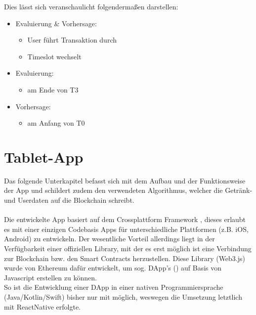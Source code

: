 Dies lässt sich veranschaulicht folgendermaßen darstellen:
\begin{itemize}
	\item Evaluierung \& Vorhersage: 
	      \begin{itemize}
	      	\item User führt Transaktion durch
	      	\item Timeslot wechselt
	      \end{itemize}
	\item Evaluierung:
	      \begin{itemize}
	      	\item am Ende von T3
	      \end{itemize}
	\item Vorhersage:
	      \begin{itemize}
	      	\item am Anfang von T0
	      \end{itemize}
\end{itemize}    


\section{Tablet-App}
\label{sec:app}

Das folgende Unterkapitel befasst sich mit dem Aufbau und der Funktionsweise der App und schildert zudem den verwendeten Algorithmus, welcher die Getränk- und Userdaten auf die Blockchain schreibt.\\\\
Die entwickelte App basiert auf dem Crossplattform Framework  \cite{RN:ReactNative}, dieses erlaubt es mit einer einzigen Codebasis Apps für unterschiedliche Plattformen (z.B. iOS, Android) zu entwickeln. Der wesentliche Vorteil allerdings liegt in der Verfügbarkeit einer offiziellen Library, mit der es erst möglich ist eine Verbindung zur Blockchain bzw. den Smart Contracts herzustellen. Diese Library (Web3.js) wurde von Ethereum dafür entwickelt, um sog. DApp's () \cite{DApp} auf Basis von Javascript erstellen zu können. \\
So ist die Entwicklung einer DApp in einer nativen Programmiersprache (Java/Kotlin/Swift) bisher nur mit  möglich, weswegen die Umsetzung letztlich mit ReactNative erfolgte.

